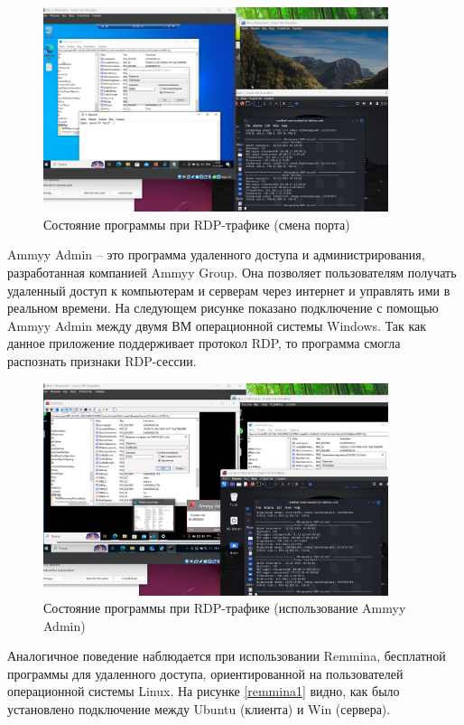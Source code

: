 \documentclass[bachelor, och, coursework]{SCWorks}
\begin{document}
\begin{figure}[H]
  \centering
  \includegraphics[width=0.9\textwidth]{pics/8rdp.png}
  \caption{Состояние программы при RDP-трафике (смена порта)}
  \label{rdp2}
\end{figure}

Ammyy Admin -- это программа удаленного доступа и администрирования, разработанная компанией Ammyy Group. Она 
позволяет пользователям получать удаленный доступ к компьютерам и серверам через интернет и управлять ими 
в реальном времени. На следующем рисунке показано подключение с помощью Ammyy Admin между двумя ВМ операционной системы Windows. 
Так как данное приложение поддерживает протокол RDP, то программа смогла распознать признаки RDP-сессии.


\begin{figure}[H]
  \centering
  \includegraphics[width=0.9\textwidth]{pics/9ammyy.png}
  \caption{Состояние программы при RDP-трафике (использование Ammyy Admin)}
  \label{ammyy1}
\end{figure}

Аналогичное поведение наблюдается при использовании Remmina, бесплатной программы для удаленного доступа, ориентированной 
на пользователей операционной системы Linux. На рисунке \ref{remmina1} видно, как было установлено подключение между Ubuntu 
(клиента) и Win (сервера).
\end{document}
